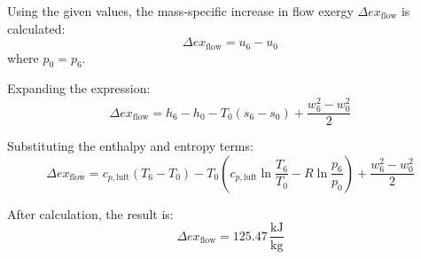 Using the given values, the mass-specific increase in flow exergy \( \Delta ex_{\text{flow}} \) is calculated:  
\[
\Delta ex_{\text{flow}} = u_6 - u_0
\]  
where \( p_0 = p_6 \).  

Expanding the expression:  
\[
\Delta ex_{\text{flow}} = h_6 - h_0 - T_0 \left( s_6 - s_0 \right) + \frac{w_6^2 - w_0^2}{2}
\]  

Substituting the enthalpy and entropy terms:  
\[
\Delta ex_{\text{flow}} = c_{p,\text{luft}} \left( T_6 - T_0 \right) - T_0 \left( c_{p,\text{luft}} \ln \frac{T_6}{T_0} - R \ln \frac{p_6}{p_0} \right) + \frac{w_6^2 - w_0^2}{2}
\]  

After calculation, the result is:  
\[
\Delta ex_{\text{flow}} = 125.47 \, \frac{\text{kJ}}{\text{kg}}
\]